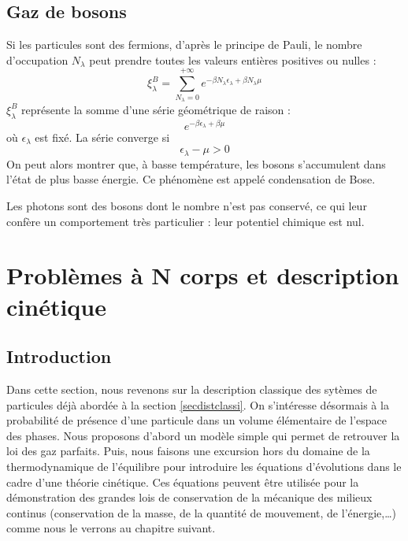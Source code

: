 \documentclass[12pt]{book}
\begin{document}
\subsection{Gaz de bosons}
Si les particules sont des fermions, d'apr\`es le principe de Pauli,
le nombre d'occupation $N_\lambda$ peut prendre toutes les valeurs
enti\`eres positives ou nulles :
\begin{equation}
\xi^B_\lambda= \sum_{N_\lambda=0}^{+\infty}e^{-\beta
N_\lambda\epsilon_\lambda+\beta N_\lambda\mu} 
\end{equation}
$\xi^B_\lambda$ repr\'esente la somme d'une s\'erie g\'eom\'etrique de
raison :
\begin{equation}
e^{-\beta \epsilon_\lambda+\beta \mu}
\end{equation}
o\`u $\epsilon_\lambda$ est fix\'e.
La s\'erie converge si 
\begin{equation}
\epsilon_\lambda-\mu>0
\end{equation}
On peut alors montrer\cite{ph:physt:Diu89} que, \`a basse temp\'erature,
les bosons s'accumulent dans l'\'etat de plus basse \'energie. Ce
ph\'enom\`ene est appel\'e condensation de Bose. 
\begin{rem}
Les photons sont des bosons dont le nombre n'est pas conserv\'e, ce
qui leur conf\`ere un comportement tr\`es particulier : leur potentiel
chimique est nul.
\end{rem}


\section{Probl\`emes \`a N corps et description cin\'etique}\label{desccinet}
\subsection{Introduction}
Dans cette section, nous revenons sur la description classique des
syt\`emes de particules d\'ej\`a abord\'ee \`a la section
\ref{secdistclassi}. On s'int\'eresse d\'esormais \`a la probabilit\'e
de pr\'esence d'une particule dans un volume \'el\'ementaire de
l'espace des phases. Nous proposons d'abord un mod\`ele simple qui
permet de retrouver la loi des gaz parfaits. Puis, nous faisons une excursion
hors du domaine de la thermodynamique de l'\'equilibre pour introduire
les \'equations d'\'evolutions dans le cadre d'une th\'eorie
cin\'etique. Ces \'equations peuvent \^etre utilis\'ee pour la
d\'emonstration des grandes lois de conservation de la m\'ecanique des
milieux continus (conservation de  la masse, de la quantit\'e de
mouvement, de l'\'energie,\dots) comme nous le verrons au chapitre
suivant. 
\end{document}
